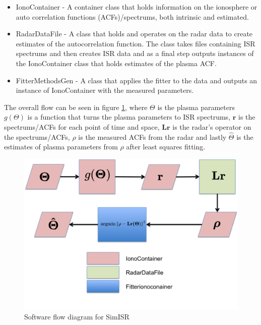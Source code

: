 \begin{itemize} 
\item IonoContainer - A container class that holds information on the ionosphere or auto correlation functions (ACFs)/spectrums, both intrinsic and estimated.

\item RadarDataFile - A class that holds and operates on the radar data to create estimates of the autocorrelation function. The class takes files containing ISR spectrums and then creates ISR data and as a final step outputs instances of the IonoContainer class that holds estimates of the plasma ACF.

\item FitterMethodsGen - A class that applies the fitter to the data and outputs an instance of IonoContainer with the measured parameters. 
\end{itemize}

The overall flow can be seen in figure \ref{fig:swflow}, where  $\Theta$ is the plasma parameters $ g(\Theta)$ is a function that turns the plasma parameters to ISR spectrums, $ \mathbf{r}$ is the spectrums/ACFs for each point of time and space, $ \mathbf{Lr}$ is the radar's operator on the spectrums/ACFs, $ \rho$ is the measured ACFs from the radar and lastly $ \hat{\Theta}$ is the estimates of plasma parameters from $ \rho$ after least squares fitting.

\begin{figure}[!h]
\centering
\includegraphics[width=6.0in]{softwareflowandmath}
\caption{Software flow diagram for SimISR}
\label{fig:swflow}
\end{figure}


